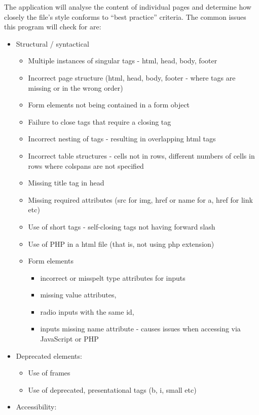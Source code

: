 \documentclass[12pt]{article}
\begin{document}
The application will analyse the content of individual pages and determine how closely the file's style conforms to ``best practice'' criteria. The common issues this program will check for are:
\begin{itemize}
\item Structural / syntactical
\begin{itemize}
\item Multiple instances of singular tags - html, head, body, footer
\item Incorrect page structure (html, head, body, footer - where tags are missing or in the wrong order)
\item Form elements not being contained in a form object
\item Failure to close tags that require a closing tag
\item Incorrect nesting of tags - resulting in overlapping html tags
\item Incorrect table structures - cells not in rows, different numbers of cells in rows where colspans are not specified
\item Missing title tag in head
\item Missing required attributes (src for img, href or name for a, href for link etc)
\item Use of short tags - self-closing tags not having forward slash
\item Use of PHP in a html file (that is, not using php extension)
\item Form elements
\begin{itemize}
\item incorrect or misspelt type attributes for inputs
\item missing value attributes,
\item radio inputs with the same id,
\item inputs missing name attribute - causes issues when accessing via \\ JavaScript or PHP
\end{itemize}\end{itemize}
\item Deprecated elements:
\begin{itemize}
\item Use of frames
\item Use of deprecated, presentational tags (b, i, small etc)
\end{itemize}
\item Accessibility:
\begin{itemize}

\end{itemize}
\end{itemize}
\end{document}
